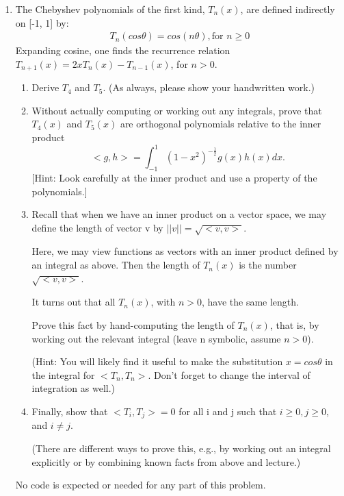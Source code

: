 \documentclass[conference,onecolumn]{IEEEtran}
\begin{document}
\begin{enumerate}[label=\arabic{enumi}.]
    \item The Chebyshev polynomials of the first kind, $T_n(x)$, are defined indirectly on [-1, 1] by:
          \begin{align*}
              T_n(cos \theta) = cos(n \theta), \text{for } n \geq 0
          \end{align*}
          Expanding cosine, one finds the recurrence relation $T_{n+1}(x) = 2xT_n(x)-T_{n-1}(x)$, for $n > 0$.
          \begin{enumerate}
              \item Derive $T_4$ and $T_5$. (As always, please show your handwritten work.)
              \item Without actually computing or working out any integrals, prove that $T_4(x)$ and $T_5(x)$ are orthogonal polynomials relative to the inner product
                    $$
                        < g, h > = \int_{-1}^{1} (1 - x^2)^{-\frac{1}{2}}g(x)h(x)dx.
                    $$
                    [Hint: Look carefully at the inner product and use a property of the polynomials.]
              \item Recall that when we have an inner product on a vector space, we may define the length of vector v by $||v|| = \sqrt{< v, v >}$.

                    Here, we may view functions as vectors with an inner product defined by an integral
                    as above.
                    Then the length of $T_n(x)$ is the number $\sqrt{< v, v >}$.

                    It turns out that all $T_n(x)$, with $n > 0$, have the same length.

                    Prove this fact by hand-computing the length of $T_n(x)$, that is, by working out the relevant integral (leave n symbolic, assume $n > 0$).

                    (Hint: You will likely find it useful to make the substitution $x = cos \theta$ in the integral for $< T_n, T_n >$. Don't forget to change the interval of integration as well.)
              \item Finally, show that $< T_i, T_j > = 0$ for all i and j such that $i \geq 0, j \geq 0$, and $i \neq j$.

                    (There are different ways to prove this, e.g., by working out an integral explicitly or by combining known facts from above and lecture.)
          \end{enumerate}
          No code is expected or needed for any part of this problem.


\end{enumerate}
\end{document}
